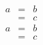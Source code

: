 \newcommand{\bea}{\begin{eqnarray}}
\newcommand{\eea}{\end{eqnarray}}
\bea a&=&b \\ &=&c \eea
\begin{eqnarray} a&=&b \\ &=&c \end{eqnarray}
